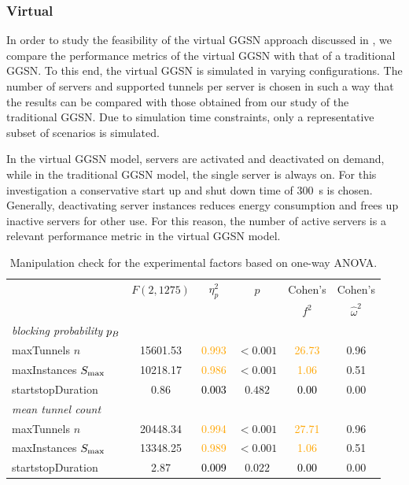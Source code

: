 \subsubsection*{Virtual }\label{sec:cloud:virtualized_network_functions:performance_evaluation:virtual_ggsn}

In order to study the feasibility of the virtual \gls{GGSN} approach discussed in , we compare the performance metrics of the virtual \gls{GGSN} with that of a traditional \gls{GGSN}.
To this end, the virtual \gls{GGSN} is simulated in varying configurations.
The number of servers and supported tunnels per server is chosen in such a way that the results can be compared with those obtained from our study of the traditional \gls{GGSN}.
Due to simulation time constraints, only a representative subset of scenarios is simulated.

In the virtual \gls{GGSN} model, servers are activated and deactivated on demand, while in the traditional \gls{GGSN} model, the single server is always on.
For this investigation a conservative start up and shut down time of \SI{300}{\second} is chosen.
Generally, deactivating server instances reduces energy consumption and frees up inactive servers for other use.
For this reason, the number of active servers is a relevant performance metric in the virtual \gls{GGSN} model.

\begin{table}\caption{Manipulation check for the experimental factors based on one-way ANOVA.}
\centering
\label{tab:cloud:virtualized_network_functions:performance_evaluation:virtual_ggsn:manipulation}
\tabcolsep=0.11cm
\begin{tabular}{lccccc}
\toprule
& \(F(2,1275)\) & \(\eta^2_p\) & \(p\) & Cohen's & Cohen's\\ 
&  & & & \(f^2\) & \(\hat{\omega}^2\) \\ 
\midrule
\emph{blocking probability} \(p_B\)  & & & & &\\ 
maxTunnels \(n\)&  15601.53 & \textcolor{orange}{0.993} & $<0.001$ & \textcolor{orange}{26.73} & 0.96\\ 
maxInstances \(S_{\max}\)&  10218.17 & \textcolor{orange}{0.986} & $<0.001$ & \textcolor{orange}{1.06} & 0.51\\ 
startstopDuration &  0.86 & \textcolor{black}{0.003} & $0.482$ & \textcolor{black}{0.00} & 0.00\\ 
\midrule
\emph{mean tunnel count}  & & & & &\\ 
maxTunnels \(n\)&  20448.34 & \textcolor{orange}{0.994} & $<0.001$ & \textcolor{orange}{27.71} & 0.96\\ 
maxInstances \(S_{\max}\)&  13348.25 & \textcolor{orange}{0.989} & $<0.001$ & \textcolor{orange}{1.06} & 0.51\\ 
startstopDuration &  2.87 & \textcolor{black}{0.009} & $0.022$ & \textcolor{black}{0.00} & 0.00\\ 
\bottomrule
\end{tabular}
\end{table}

